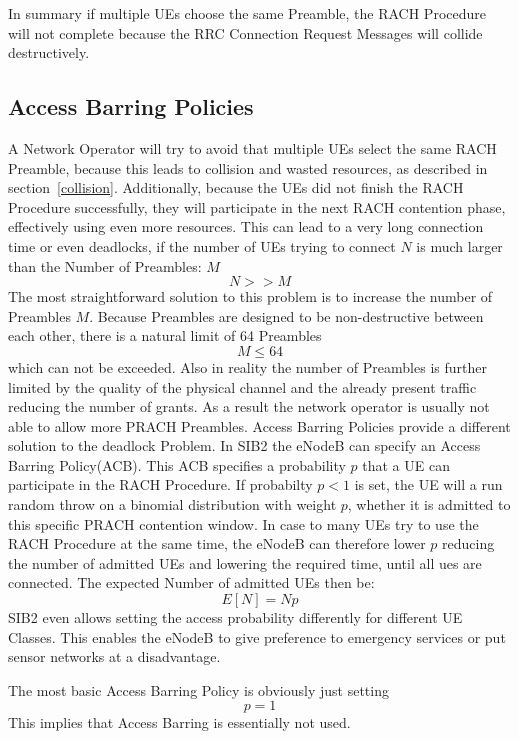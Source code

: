 \documentclass[conference]{IEEEtran}
\begin{document}
In summary if multiple UEs choose the same Preamble, the RACH Procedure will not complete because the RRC Connection Request Messages will collide destructively.

\subsection{Access Barring Policies}\label{ACB}
A Network Operator will try to avoid that multiple UEs select the same RACH Preamble, because this leads to collision and wasted resources, as described in section~\ref{collision}.
Additionally, because the UEs did not finish the RACH Procedure successfully, they will participate in the next RACH contention phase, effectively using even more resources.
This can lead to a very long connection time or even deadlocks, if the number of UEs trying to connect $N$ is much larger than the Number of Preambles: $M$ \[N>>M\]
The most straightforward solution to this problem is to increase the number of Preambles $M$.
Because Preambles are designed to be non-destructive between each other, there is a natural limit of 64 Preambles \[M\leq64\] which can not be exceeded.
Also in reality the number of Preambles is further limited by the quality of the physical channel and the already present traffic reducing the number of grants.
As a result the network operator is usually not able to allow more PRACH Preambles.
Access Barring Policies provide a different solution to the deadlock Problem.
In SIB2 the eNodeB can specify an Access Barring Policy(ACB).
This ACB specifies a probability $p$ that a UE can participate in the RACH Procedure.
If probabilty $p<1$ is set, the UE will a run random throw on a binomial distribution with weight $p$, whether it is admitted to this specific PRACH contention window.
In case to many UEs try to use the RACH Procedure at the same time, the eNodeB can therefore lower $p$ reducing the number of admitted UEs and lowering the required time, until all ues are connected.
The expected Number of admitted UEs then be:\[E[N]= Np\]
SIB2 even allows setting the access probability differently for different UE Classes.
This enables the eNodeB to give preference to emergency services or put sensor networks at a disadvantage.

The most basic Access Barring Policy is obviously just setting \[p=1\]
This implies that Access Barring is essentially not used.
\end{document}
